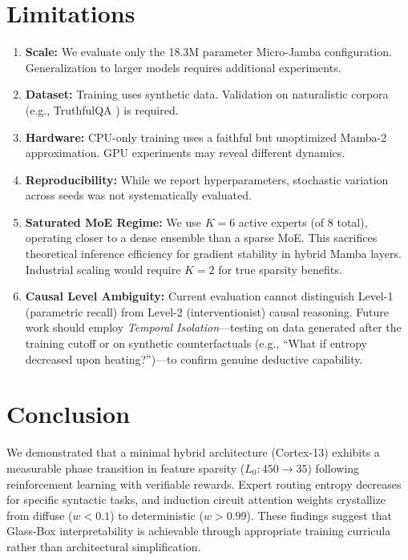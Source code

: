 \documentclass[12pt, a4paper]{article}
\begin{document}
\section{Limitations}
\begin{enumerate}
    \item \textbf{Scale:} We evaluate only the 18.3M parameter Micro-Jamba configuration. Generalization to larger models requires additional experiments.
    \item \textbf{Dataset:} Training uses synthetic data. Validation on naturalistic corpora (e.g., TruthfulQA \cite{Lin2022TruthfulQA}) is required.
    \item \textbf{Hardware:} CPU-only training uses a faithful but unoptimized Mamba-2 approximation. GPU experiments may reveal different dynamics.
    \item \textbf{Reproducibility:} While we report hyperparameters, stochastic variation across seeds was not systematically evaluated.
    \item \textbf{Saturated MoE Regime:} We use $K=6$ active experts (of 8 total), operating closer to a dense ensemble than a sparse MoE. This sacrifices theoretical inference efficiency for gradient stability in hybrid Mamba layers. Industrial scaling would require $K=2$ for true sparsity benefits.
    \item \textbf{Causal Level Ambiguity:} Current evaluation cannot distinguish Level-1 (parametric recall) from Level-2 (interventionist) causal reasoning. Future work should employ \textit{Temporal Isolation}---testing on data generated after the training cutoff or on synthetic counterfactuals (e.g., ``What if entropy decreased upon heating?'')---to confirm genuine deductive capability.
\end{enumerate}


\section{Conclusion}
We demonstrated that a minimal hybrid architecture (Cortex-13) exhibits a measurable phase transition in feature sparsity ($L_0: 450 \rightarrow 35$) following reinforcement learning with verifiable rewards. Expert routing entropy decreases for specific syntactic tasks, and induction circuit attention weights crystallize from diffuse ($w<0.1$) to deterministic ($w>0.99$). These findings suggest that Glass-Box interpretability is achievable through appropriate training curricula rather than architectural simplification.
\end{document}

